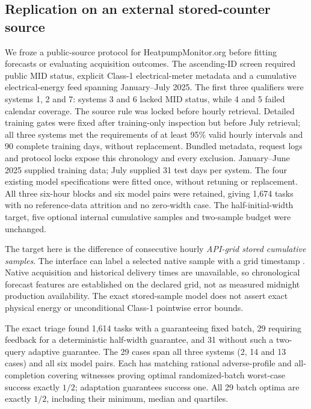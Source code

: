\documentclass[12pt]{article}
\begin{document}
\subsection{Replication on an external stored-counter source}
\label{sec:external-hpm}
We froze a public-source protocol for HeatpumpMonitor.org \citep{hpmabout,hpmapi} before fitting
forecasts or evaluating acquisition outcomes. The ascending-ID screen
required public MID status, explicit Class-1 electrical-meter metadata and
a cumulative electrical-energy feed spanning January--July 2025. The first
three qualifiers were systems 1, 2 and 7: systems 3 and 6 lacked MID status,
while 4 and 5 failed calendar coverage. The source rule was locked before
hourly retrieval. Detailed training gates were fixed after training-only
inspection but before July retrieval; all three systems met the requirements
of at least 95\% valid hourly intervals and 90 complete training days, without
replacement. Bundled metadata, request logs and protocol locks expose this
chronology and every exclusion. January--June 2025 supplied training data; July supplied 31 test
days per system. The four existing model specifications were fitted once,
without retuning or replacement. All three six-hour blocks and six model
pairs were retained, giving 1,674 tasks with no reference-data attrition
and no zero-width case. The half-initial-width target, five optional
internal cumulative samples and two-sample budget were unchanged.

The target here is the difference of consecutive hourly \emph{API-grid
stored cumulative samples}. The interface can label a selected native
sample with a grid timestamp \citep{hpmcode}. Native acquisition and historical delivery
times are unavailable, so chronological forecast features are established
on the declared grid, not as measured midnight production availability.
The exact stored-sample model does not assert exact physical energy or
unconditional Class-1 pointwise error bounds.

The exact triage found 1,614 tasks with a guaranteeing fixed batch, 29
requiring feedback for a deterministic half-width guarantee, and 31
without such a two-query adaptive guarantee. The 29 cases span all three
systems (2, 14 and 13 cases) and all six model pairs. Each has matching
rational adverse-profile and all-completion covering witnesses proving
optimal randomized-batch worst-case success exactly $1/2$; adaptation
guarantees success one. All 29 batch optima are exactly $1/2$, including
their minimum, median and quartiles.
\end{document}
